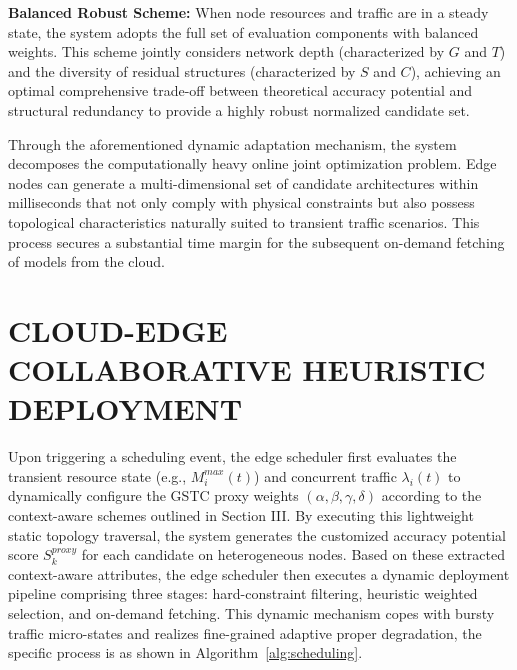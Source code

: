 \documentclass[conference]{IEEEtran}
\begin{document}
\textbf{Balanced Robust Scheme:} 
When node resources and traffic are in a steady state, the system adopts the full set of evaluation components with balanced weights. This scheme jointly considers network depth (characterized by $G$ and $T$) and the diversity of residual structures (characterized by $S$ and $C$), achieving an optimal comprehensive trade-off between theoretical accuracy potential and structural redundancy to provide a highly robust normalized candidate set.

Through the aforementioned dynamic adaptation mechanism, the system decomposes the computationally heavy online joint optimization problem. Edge nodes can generate a multi-dimensional set of candidate architectures within milliseconds that not only comply with physical constraints but also possess topological characteristics naturally suited to transient traffic scenarios. This process secures a substantial time margin for the subsequent on-demand fetching of models from the cloud.

\section{CLOUD-EDGE COLLABORATIVE HEURISTIC DEPLOYMENT}
Upon triggering a scheduling event, the edge scheduler first evaluates the transient resource state (e.g., $M_{i}^{max}(t)$) and concurrent traffic $\lambda_{i}(t)$ to dynamically configure the GSTC proxy weights $(\alpha, \beta, \gamma, \delta)$ according to the context-aware schemes outlined in Section III. By executing this lightweight static topology traversal, the system generates the customized accuracy potential score $S_{k}^{proxy}$ for each candidate on heterogeneous nodes. Based on these extracted context-aware attributes, the edge scheduler then executes a dynamic deployment pipeline comprising three stages: hard-constraint filtering, heuristic weighted selection, and on-demand fetching. This dynamic mechanism copes with bursty traffic micro-states and realizes fine-grained adaptive proper degradation, the specific process is as shown in Algorithm~\ref{alg:scheduling}.
\end{document}
